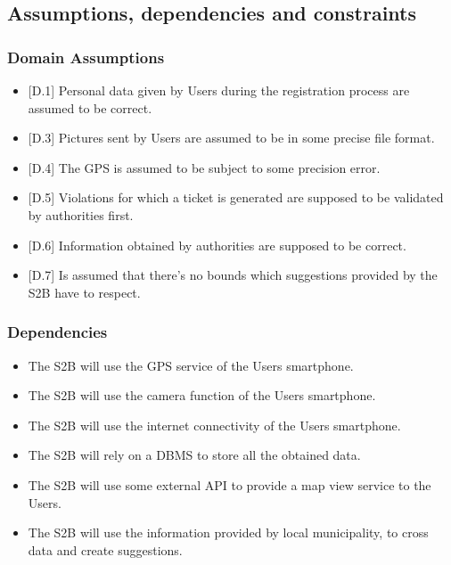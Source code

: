 \subsection{Assumptions,
dependencies
and
constraints}


\subsubsection{Domain Assumptions}
\begin{itemize}
    \item {[D.1]} Personal data given by Users during the registration process are assumed to be correct.
    \item {[D.3]} Pictures sent by Users are assumed to be in some precise file format.
    \item {[D.4]} The GPS is assumed to be subject to some precision error.
    \item {[D.5]} Violations for which a ticket is generated are supposed to be validated by authorities first.
    \item {[D.6]} Information obtained by authorities are supposed to be correct.
    \item {[D.7]} Is assumed that there's no bounds which suggestions provided by the S2B have to respect.\\
\end{itemize}

\subsubsection{Dependencies}
\begin{itemize}
    \item The S2B will use the GPS service of the Users smartphone.
    \item The S2B will use the camera function of the Users smartphone.
    \item The S2B will use the internet connectivity of the Users smartphone.
    \item The S2B will rely on a DBMS to store all the obtained data.
    \item The S2B will use some external API to provide  a map view service to the Users.
    \item The S2B will use the information provided by local municipality, to cross data and create suggestions.\\
\end{itemize}






